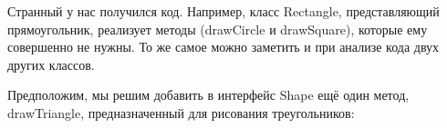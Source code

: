 \documentclass[a4paper]{article}
\begin{document}
\begin{figure}[h]
\end{figure}

Странный у нас получился код. Например, класс Rectangle, представляющий прямоугольник, реализует методы (drawCircle и drawSquare), которые ему совершенно не нужны. То же самое можно заметить и при анализе кода двух других классов.

\newpage
Предположим, мы решим добавить в интерфейс Shape ещё один метод, drawTriangle, предназначенный для рисования треугольников:
\end{document}
